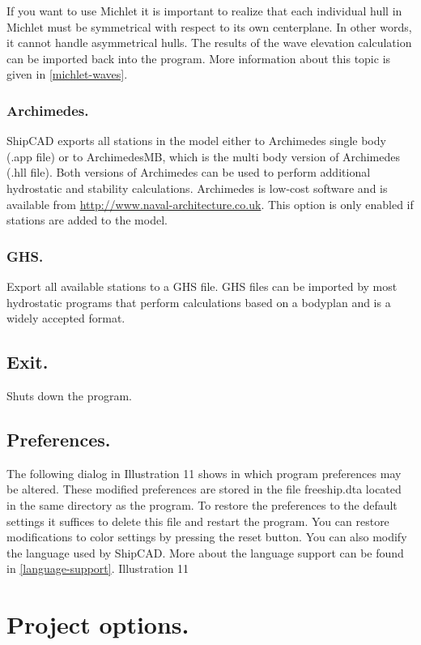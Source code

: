 \documentclass[12pt]{article}
\begin{document}
If you want to use Michlet it is important to realize that each
individual hull in Michlet must be symmetrical with respect to its own
centerplane. In other words, it cannot handle asymmetrical hulls.  The
results of the wave elevation calculation can be imported back into
the program. More information about this topic is given in \ref{michlet-waves}.

\subsubsection{Archimedes.}
ShipCAD exports all stations in the model either to Archimedes single
body (.app file) or to ArchimedesMB, which is the multi body version
of Archimedes (.hll file). Both versions of Archimedes can be used to
perform additional hydrostatic and stability calculations. Archimedes
is low-cost software and is available
from \url{http://www.naval-architecture.co.uk}. This option is only
enabled if stations are added to the model.

\subsubsection{GHS.}
Export all available stations to a GHS file. GHS files can be imported
by most hydrostatic programs that perform calculations based on a
bodyplan and is a widely accepted format.

\subsection{Exit.}
Shuts down the program.

\subsection{Preferences.}
The following dialog in Illustration 11 shows in which program
preferences may be altered. These modified preferences are stored in
the file freeship.dta located in the same directory as the program. To
restore the preferences to the default settings it suffices to delete
this file and restart the program. You can restore modifications to
color settings by pressing the reset button.  You can also modify the
language used by ShipCAD. More about the language support can be found
in \ref{language-support}.
Illustration 11

\section{Project options.}
\end{document}
